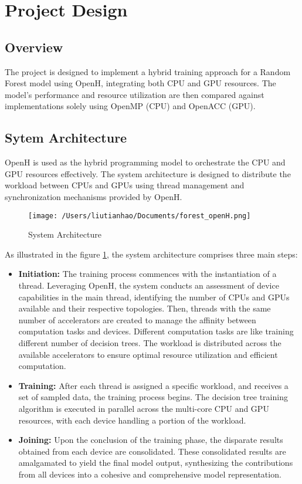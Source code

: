 \documentclass[13pt]{article}
\begin{document}
\section{Project Design}
\subsection{Overview}
The project is designed to implement a hybrid training approach for a Random Forest model using OpenH, integrating both CPU and GPU resources. 
The model's performance and resource utilization are then compared against implementations solely using OpenMP (CPU) and OpenACC (GPU).

\subsection{Sytem Architecture}
OpenH is used as the hybrid programming model to orchestrate the CPU and GPU resources effectively. 
The system architecture is designed to distribute the workload between CPUs and GPUs using thread management and synchronization mechanisms provided by OpenH.
\begin{figure}[ht]
    \centering
    \texttt{[image: /Users/liutianhao/Documents/forest\_openH.png]}
    \caption{System Architecture}
    \label{fig:system_architecture}
\end{figure}


As illustrated in the figure \ref{fig:system_architecture}, the system architecture comprises three main steps:
\begin{itemize}
    \item \textbf{Initiation:} 
    The training process commences with the instantiation of a thread.
    Leveraging OpenH, the system conducts an assessment of device capabilities in the main thread, identifying the number of CPUs and GPUs available and their respective topologies.
    Then, threads with the same number of accelerators are created to manage the affinity between computation tasks and devices.
    Different computation tasks are like training different number of decision trees. 
    The workload is distributed across the available accelerators to ensure optimal resource utilization and efficient computation.
    \item \textbf{Training:} 
    After each thread is assigned a specific workload, and receives a set of sampled data, the training process begins.
    The decision tree training algorithm is executed in parallel across the multi-core CPU and GPU resources, with each device handling a portion of the workload.
    \item \textbf{Joining:} 
    Upon the conclusion of the training phase, the disparate results obtained from each device are consolidated.
    These consolidated results are amalgamated to yield the final model output, synthesizing the contributions from all devices into a cohesive and comprehensive model representation.
\end{itemize}
\end{document}
